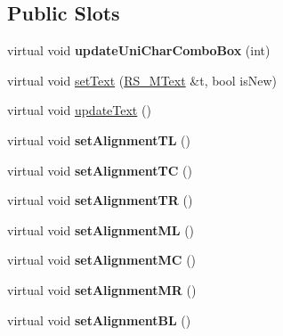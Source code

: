 \subsection*{Public Slots}
\begin{DoxyCompactItemize}
\item 
\hypertarget{classQG__DlgMText_a98c53837b0cfffc03398378540c8a41a}{virtual void {\bfseries update\-Uni\-Char\-Combo\-Box} (int)}\label{classQG__DlgMText_a98c53837b0cfffc03398378540c8a41a}

\item 
virtual void \hyperlink{classQG__DlgMText_af3c4131f77d73196cdf04361455e1d98}{set\-Text} (\hyperlink{classRS__MText}{R\-S\-\_\-\-M\-Text} \&t, bool is\-New)
\item 
virtual void \hyperlink{classQG__DlgMText_aa6d4a111222fe7a3caa0bb14062c4e0f}{update\-Text} ()
\item 
\hypertarget{classQG__DlgMText_a32599c48275620cd4ecd1cd287d2a53c}{virtual void {\bfseries set\-Alignment\-T\-L} ()}\label{classQG__DlgMText_a32599c48275620cd4ecd1cd287d2a53c}

\item 
\hypertarget{classQG__DlgMText_afba04a717482c3ec5ac07b276da08fbe}{virtual void {\bfseries set\-Alignment\-T\-C} ()}\label{classQG__DlgMText_afba04a717482c3ec5ac07b276da08fbe}

\item 
\hypertarget{classQG__DlgMText_a03b20f4d6d25a9dd610372a561b3502e}{virtual void {\bfseries set\-Alignment\-T\-R} ()}\label{classQG__DlgMText_a03b20f4d6d25a9dd610372a561b3502e}

\item 
\hypertarget{classQG__DlgMText_a7a468fabf32c4dd1ed71ac41c4c706aa}{virtual void {\bfseries set\-Alignment\-M\-L} ()}\label{classQG__DlgMText_a7a468fabf32c4dd1ed71ac41c4c706aa}

\item 
\hypertarget{classQG__DlgMText_a281fff0946971b4964e40b92f3ecc033}{virtual void {\bfseries set\-Alignment\-M\-C} ()}\label{classQG__DlgMText_a281fff0946971b4964e40b92f3ecc033}

\item 
\hypertarget{classQG__DlgMText_a319d384f152f41606ce28d3222649f98}{virtual void {\bfseries set\-Alignment\-M\-R} ()}\label{classQG__DlgMText_a319d384f152f41606ce28d3222649f98}

\item 
\hypertarget{classQG__DlgMText_a043909c25333c9d2a921a2fa22969f5a}{virtual void {\bfseries set\-Alignment\-B\-L} ()}\label{classQG__DlgMText_a043909c25333c9d2a921a2fa22969f5a}


\end{DoxyCompactItemize}
